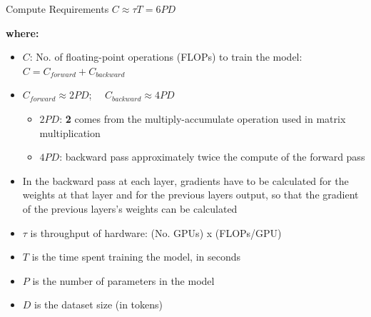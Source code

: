 \begin{vbframe}{Compute Requirements $C \approx \tau T = 6 P D$ }

\textbf{where:}

\begin{itemize}
    \item $C$: No. of floating-point operations (FLOPs) to train the model:\\
          $C = C_{forward} + C_{backward}$
	\item $C_{forward} \approx 2 P D$; $\quad C_{backward} \approx 4 P D$
	\begin{itemize}
	    \item $2PD$: \textbf{2} comes from the multiply-accumulate operation used in matrix multiplication
        \item $4PD$: backward pass approximately twice the compute of the forward pass
	\end{itemize}
    \item In the backward pass at each layer, gradients have to be calculated for the weights at that layer and for the previous layers output, so that the gradient of the previous layers's weights can be calculated
	\item $\tau$ is throughput of hardware: (No. GPUs) x (FLOPs/GPU)
	\item $T$ is the time spent training the model, in seconds
	\item $P$ is the number of parameters in the model
	\item $D$ is the dataset size (in tokens)
\end{itemize}

\end{vbframe}


